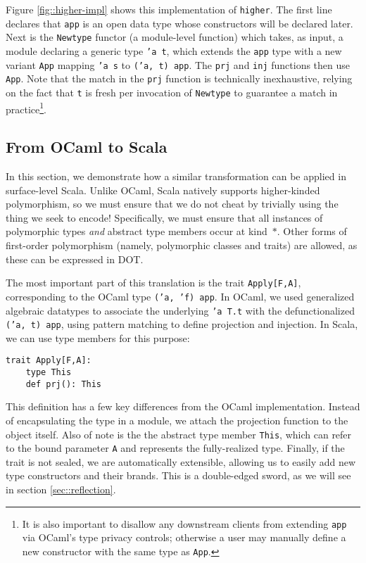 \documentclass[acmsmall,screen]{acmart}
\begin{document}
Figure \ref{fig::higher-impl} shows this implementation of \texttt{higher}.
The first line declares that \texttt{app} is an open data type whose
constructors will be declared later. Next is the \texttt{Newtype} functor
(a module-level function) which takes, as input, a module declaring a
generic type \texttt{'a t}, which extends the \texttt{app} type with a new
variant \texttt{App} mapping \texttt{'a s} to \texttt{('a, t) app}. The
\texttt{prj} and \texttt{inj} functions then use \texttt{App}. Note that the
match in the \texttt{prj} function is technically inexhaustive, relying on the
fact that \texttt{t} is fresh per invocation of \texttt{Newtype} to guarantee a
match in practice\footnote{It is also important to disallow any downstream
clients from extending \texttt{app} via OCaml's type privacy controls;
otherwise a user may manually define a new constructor with the same type as
\texttt{App}.}.

\subsection{From OCaml to Scala}\label{sec::surface}

In this section, we demonstrate how a similar transformation can be applied in
surface-level Scala. Unlike OCaml, Scala natively supports higher-kinded
polymorphism, so we must ensure that we do not cheat by trivially using the
thing we seek to encode! Specifically, we must ensure that all instances of
polymorphic types \emph{and} abstract type members occur at kind~$*$. Other
forms of first-order polymorphism (namely, polymorphic classes and traits) are
allowed, as these can be expressed in DOT.

The most important part of this translation is the trait \texttt{Apply[F,A]},
corresponding to the OCaml type \texttt{('a, 'f) app}. In OCaml, we used
generalized algebraic datatypes to associate the underlying \texttt{'a T.t}
with the defunctionalized \texttt{('a, t) app}, using pattern matching to
define projection and injection. In Scala, we can use type members for this
purpose:

\begin{lstlisting}[style=scala]
  trait Apply[F,A]:
    type This
    def prj(): This
\end{lstlisting}

This definition has a few key differences from the OCaml implementation.
Instead of encapsulating the type in a module, we attach the projection
function to the object itself. Also of note is the the abstract type member
\texttt{This}, which can refer to the bound parameter \texttt{A} and represents
the fully-realized type. Finally, if the trait is not sealed, we are
automatically extensible, allowing us to easily add new type constructors and
their brands. This is a double-edged sword, as we will see in section
\ref{sec::reflection}.
\end{document}
